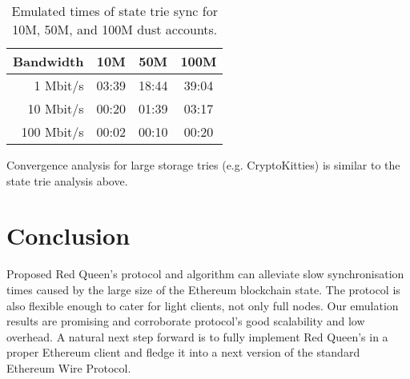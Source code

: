 \documentclass{amsart}
\begin{document}
\begin{table}[h]
\begin{tabular}{ r | c c c }
    Bandwidth & 10M & 50M & 100M \\
    \hline
      1 Mbit/s & 03:39 & 18:44 & 39:04 \\
     10 Mbit/s & 00:20 & 01:39 & 03:17 \\
    100 Mbit/s & 00:02 & 00:10 & 00:20 \\
\end{tabular}
\caption{Emulated times of state trie sync for 10M, 50M, and 100M dust accounts.}
\label{tab:emulated_time}
\end{table}

Convergence analysis for large storage tries (e.g. CryptoKitties) is similar to the state trie analysis above.

\section{Conclusion}

Proposed Red Queen's protocol and algorithm can alleviate slow synchronisation times
caused by the large size of the Ethereum blockchain state.
The protocol is also flexible enough to cater for light clients, not only full nodes.
Our emulation results are promising and corroborate protocol's good scalability and low overhead.
A natural next step forward is to fully implement Red Queen's in a proper Ethereum client
and fledge it into a next version of the standard Ethereum Wire Protocol.



\end{document}
